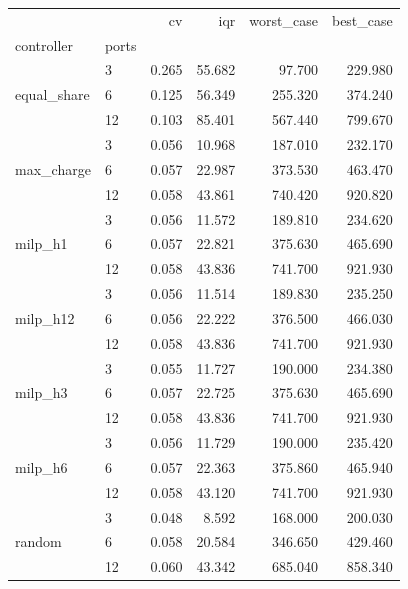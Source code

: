 \begin{tabular}{llrrrr}
\toprule
 &  & cv & iqr & worst_case & best_case \\
controller & ports &  &  &  &  \\
\midrule
\multirow[t]{3}{*}{equal_share} & 3 & 0.265 & 55.682 & 97.700 & 229.980 \\
 & 6 & 0.125 & 56.349 & 255.320 & 374.240 \\
 & 12 & 0.103 & 85.401 & 567.440 & 799.670 \\
\cline{1-6}
\multirow[t]{3}{*}{max_charge} & 3 & 0.056 & 10.968 & 187.010 & 232.170 \\
 & 6 & 0.057 & 22.987 & 373.530 & 463.470 \\
 & 12 & 0.058 & 43.861 & 740.420 & 920.820 \\
\cline{1-6}
\multirow[t]{3}{*}{milp_h1} & 3 & 0.056 & 11.572 & 189.810 & 234.620 \\
 & 6 & 0.057 & 22.821 & 375.630 & 465.690 \\
 & 12 & 0.058 & 43.836 & 741.700 & 921.930 \\
\cline{1-6}
\multirow[t]{3}{*}{milp_h12} & 3 & 0.056 & 11.514 & 189.830 & 235.250 \\
 & 6 & 0.056 & 22.222 & 376.500 & 466.030 \\
 & 12 & 0.058 & 43.836 & 741.700 & 921.930 \\
\cline{1-6}
\multirow[t]{3}{*}{milp_h3} & 3 & 0.055 & 11.727 & 190.000 & 234.380 \\
 & 6 & 0.057 & 22.725 & 375.630 & 465.690 \\
 & 12 & 0.058 & 43.836 & 741.700 & 921.930 \\
\cline{1-6}
\multirow[t]{3}{*}{milp_h6} & 3 & 0.056 & 11.729 & 190.000 & 235.420 \\
 & 6 & 0.057 & 22.363 & 375.860 & 465.940 \\
 & 12 & 0.058 & 43.120 & 741.700 & 921.930 \\
\cline{1-6}
\multirow[t]{3}{*}{random} & 3 & 0.048 & 8.592 & 168.000 & 200.030 \\
 & 6 & 0.058 & 20.584 & 346.650 & 429.460 \\
 & 12 & 0.060 & 43.342 & 685.040 & 858.340 \\
\cline{1-6}
\bottomrule
\end{tabular}
